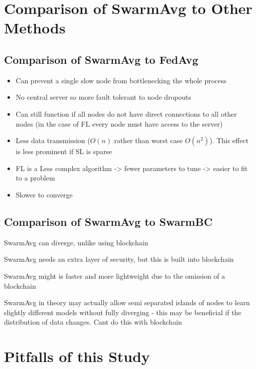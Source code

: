 \section{Comparison of SwarmAvg to Other Methods}

\subsection{Comparison of SwarmAvg to FedAvg}

\begin{itemize}
	\item Can prevent a single slow node from bottlenecking the whole process
	\item No central server so more fault tolerant to node dropouts
	\item Can still function if all nodes do not have direct connections to all other nodes (in the case of FL every node must have access to the server)
\end{itemize}


\begin{itemize}
	\item Less data transmission ($O(n)$ rather than worst case $O(n^2)$). This effect is less prominent if SL is sparse
	\item FL is a Less complex algorithm -> fewer parameters to tune -> easier to fit to a problem
	\item Slower to converge
\end{itemize}

\subsection{Comparison of SwarmAvg to SwarmBC}

SwarmAvg can diverge, unlike using blockchain

SwarmAvg needs an extra layer of security, but this is built into blockchain

SwarmAvg might is faster and more lightweight due to the omission of a blockchain

SwarmAvg in theory may actually allow semi separated islands of nodes to learn slightly different models without fully diverging - this may be beneficial if the distribution of data changes. Cant do this with blockchain

\section{Pitfalls of this Study}

